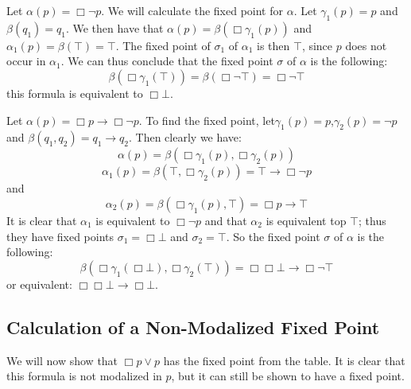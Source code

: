 \documentclass[../main.tex]{subfiles}
\begin{document}
\begin{exmp}
	Let $\alpha(p)=\Box \neg p$. We will calculate the fixed point for
	$\alpha$. Let $\gamma_1 (p)=p$ and $\beta(q_1)=q_1$. We then have that
	$\alpha(p)=\beta(\Box\gamma_1(p))$ and $\alpha_1(p)=\beta(\top)=\top$.
	The fixed point of $\sigma_1$ of $\alpha_1$ is then $\top$, since $p$
	does not occur in $\alpha_1$. We can thus conclude that the fixed point
	$\sigma$ of $\alpha$ is the following:
	\[\beta(\Box\gamma_1(\top))=\beta(\Box\neg\top)=\Box\neg\top\]
	this formula is equivalent to $\Box\bot$.
\end{exmp}
\begin{exmp}
	Let $\alpha(p)=\Box p\rightarrow\Box\neg p$. To find the fixed point,
	let$\gamma_1(p)=p$,$\gamma_2(p)=\neg p$ and
	$\beta(q_1,q_2)=q_1\rightarrow q_2$. Then clearly we have:
	\[\alpha(p)=\beta(\Box\gamma_1(p),\Box\gamma_2(p))\]
	\[\alpha_1(p)=\beta(\top,\Box\gamma_2(p))=\top\rightarrow\Box\neg p\]
	and 
	\[\alpha_2(p)=\beta(\Box\gamma_1(p),\top)=\Box p\rightarrow \top\]
	It is clear that $\alpha_1$ is equivalent to $\Box\neg p$ and that
	$\alpha_2$ is equivalent top $\top$; thus they have fixed points
	$\sigma_1=\Box\bot$ and $\sigma_2=\top$. So the fixed point $\sigma$
	of $\alpha$ is the following:
	\[\beta(\Box\gamma_1(\Box\bot),\Box\gamma_2(\top))=\Box\Box\bot\rightarrow\Box\neg\top\]
	or equivalent: $\Box\Box\bot\rightarrow\Box\bot$.
\end{exmp}
\subsection{Calculation of a Non-Modalized Fixed Point}
We will now show that $\Box p\vee p$ has the fixed point from the table. It is
clear that this formula is not modalized in $p$, but it can still be shown to
have a fixed point.
\end{document}
